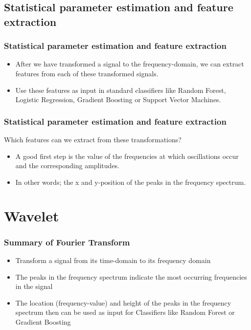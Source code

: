 \documentclass{beamer}
\begin{document}
	\subsection{Statistical parameter estimation and feature extraction}
	\begin{frame}
		\frametitle{Statistical parameter estimation and feature extraction}
		
		\begin{itemize}
			\item
			
			After we have transformed a signal to the frequency-domain, we can extract features from each of these transformed signals.
			
			\item
			
			Use these features as input in standard classifiers like Random Forest, Logistic Regression, Gradient Boosting or Support Vector Machines.
			
		\end{itemize}	
		
	\end{frame}

\begin{frame}
	\frametitle{Statistical parameter estimation and feature extraction}
		Which features can we extract from these transformations? 
	
	\begin{itemize}


		\item
		
		A good first step is the value of the frequencies at which oscillations occur and the corresponding amplitudes.
		
		\item
		
		In other words; the x and y-position of the peaks in the frequency spectrum.
	\end{itemize}
	
\end{frame}



\section{Wavelet}
\begin{frame}
	\frametitle{Summary of Fourier Transform}
	
	\begin{itemize}
		\item 
		 Transform a signal from its time-domain to its frequency domain
		
		\item
		
		 The peaks in the frequency spectrum indicate the most occurring frequencies in the signal
		
		
		\item
		The location (frequency-value) and height of the peaks in the frequency spectrum then can be used as input for Classifiers like Random Forest or Gradient Boosting

	\end{itemize}
	
\end{frame}
\end{document}

